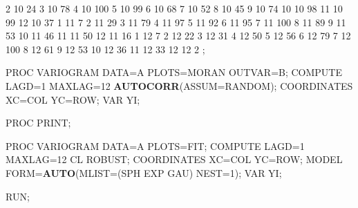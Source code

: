 \documentclass[]{book}
\newenvironment{Shaded}{\begin{snugshade}}{\end{snugshade}}
\newcommand{\DataTypeTok}[1]{\textcolor[rgb]{0.13,0.29,0.53}{#1}}
\newcommand{\DecValTok}[1]{\textcolor[rgb]{0.00,0.00,0.81}{#1}}
\newcommand{\KeywordTok}[1]{\textcolor[rgb]{0.13,0.29,0.53}{\textbf{#1}}}
\newcommand{\NormalTok}[1]{#1}
\begin{document}
\begin{Shaded}
\begin{Highlighting}[]
\DecValTok{2}   \DecValTok{10}  \DecValTok{24}
\DecValTok{3}   \DecValTok{10}  \DecValTok{78}
\DecValTok{4}   \DecValTok{10}  \DecValTok{100}
\DecValTok{5}   \DecValTok{10}  \DecValTok{99}
\DecValTok{6}   \DecValTok{10}  \DecValTok{68}
\DecValTok{7}   \DecValTok{10}  \DecValTok{52}
\DecValTok{8}   \DecValTok{10}  \DecValTok{45}
\DecValTok{9}   \DecValTok{10}  \DecValTok{74}
\DecValTok{10}  \DecValTok{10}  \DecValTok{98}
\DecValTok{11}  \DecValTok{10}  \DecValTok{99}
\DecValTok{12}  \DecValTok{10}  \DecValTok{37}
\DecValTok{1}   \DecValTok{11}  \DecValTok{7}
\DecValTok{2}   \DecValTok{11}  \DecValTok{29}
\DecValTok{3}   \DecValTok{11}  \DecValTok{79}
\DecValTok{4}   \DecValTok{11}  \DecValTok{97}
\DecValTok{5}   \DecValTok{11}  \DecValTok{92}
\DecValTok{6}   \DecValTok{11}  \DecValTok{95}
\DecValTok{7}   \DecValTok{11}  \DecValTok{100}
\DecValTok{8}   \DecValTok{11}  \DecValTok{89}
\DecValTok{9}   \DecValTok{11}  \DecValTok{53}
\DecValTok{10}  \DecValTok{11}  \DecValTok{46}
\DecValTok{11}  \DecValTok{11}  \DecValTok{50}
\DecValTok{12}  \DecValTok{11}  \DecValTok{16}
\DecValTok{1}   \DecValTok{12}  \DecValTok{7}
\DecValTok{2}   \DecValTok{12}  \DecValTok{22}
\DecValTok{3}   \DecValTok{12}  \DecValTok{31}
\DecValTok{4}   \DecValTok{12}  \DecValTok{50}
\DecValTok{5}   \DecValTok{12}  \DecValTok{56}
\DecValTok{6}   \DecValTok{12}  \DecValTok{79}
\DecValTok{7}   \DecValTok{12}  \DecValTok{100}
\DecValTok{8}   \DecValTok{12}  \DecValTok{61}
\DecValTok{9}   \DecValTok{12}  \DecValTok{53}
\DecValTok{10}  \DecValTok{12}  \DecValTok{36}
\DecValTok{11}  \DecValTok{12}  \DecValTok{33}
\DecValTok{12}  \DecValTok{12}  \DecValTok{2}
\NormalTok{;}

\NormalTok{PROC VARIOGRAM DATA=A PLOTS=MORAN OUTVAR=B;}
\NormalTok{COMPUTE LAGD=}\DecValTok{1}\NormalTok{ MAXLAG=}\DecValTok{12} \KeywordTok{AUTOCORR}\NormalTok{(}\DataTypeTok{ASSUM=}\NormalTok{RANDOM);}
\NormalTok{COORDINATES XC=COL YC=ROW;}
\NormalTok{VAR YI;}

\NormalTok{PROC PRINT;}

\NormalTok{PROC VARIOGRAM DATA=A PLOTS=FIT;}
\NormalTok{COMPUTE LAGD=}\DecValTok{1}\NormalTok{ MAXLAG=}\DecValTok{12}\NormalTok{ CL ROBUST;}
\NormalTok{COORDINATES XC=COL YC=ROW;}
\NormalTok{MODEL FORM=}\KeywordTok{AUTO}\NormalTok{(}\DataTypeTok{MLIST=}\NormalTok{(SPH EXP GAU) }\DataTypeTok{NEST=}\DecValTok{1}\NormalTok{);}
\NormalTok{VAR YI;}

\NormalTok{RUN;}
\end{Highlighting}
\end{Shaded}
\end{document}
